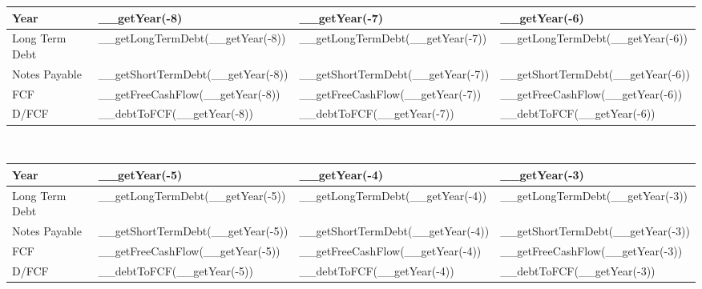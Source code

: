 \begin{tabularx}{\textwidth}{|X|X|X|X|}
 \hline
 Year                       & __getYear(-8)                           & __getYear(-7)                           & __getYear(-6)                     \\
 \hline
 Long Term Debt             & __getLongTermDebt(__getYear(-8))        & __getLongTermDebt(__getYear(-7))        & __getLongTermDebt(__getYear(-6))  \\
 Notes Payable              & __getShortTermDebt(__getYear(-8))       & __getShortTermDebt(__getYear(-7))       & __getShortTermDebt(__getYear(-6)) \\
 FCF                        & __getFreeCashFlow(__getYear(-8))        & __getFreeCashFlow(__getYear(-7))        & __getFreeCashFlow(__getYear(-6))  \\
 \rowcolor{lightgray} D/FCF & __debtToFCF(__getYear(-8))              & __debtToFCF(__getYear(-7))              & __debtToFCF(__getYear(-6))        \\
 \hline
\end{tabularx}\\

\begin{tabularx}{\textwidth}{|X|X|X|X|}
 \hline
 Year                       & __getYear(-5)                           & __getYear(-4)                           & __getYear(-3)                     \\
 \hline
 Long Term Debt             & __getLongTermDebt(__getYear(-5))        & __getLongTermDebt(__getYear(-4))        & __getLongTermDebt(__getYear(-3))  \\
 Notes Payable              & __getShortTermDebt(__getYear(-5))       & __getShortTermDebt(__getYear(-4))       & __getShortTermDebt(__getYear(-3)) \\
 FCF                        & __getFreeCashFlow(__getYear(-5))        & __getFreeCashFlow(__getYear(-4))        & __getFreeCashFlow(__getYear(-3))  \\
 \rowcolor{lightgray} D/FCF & __debtToFCF(__getYear(-5))              & __debtToFCF(__getYear(-4))              & __debtToFCF(__getYear(-3))        \\
 \hline
\end{tabularx}\\

